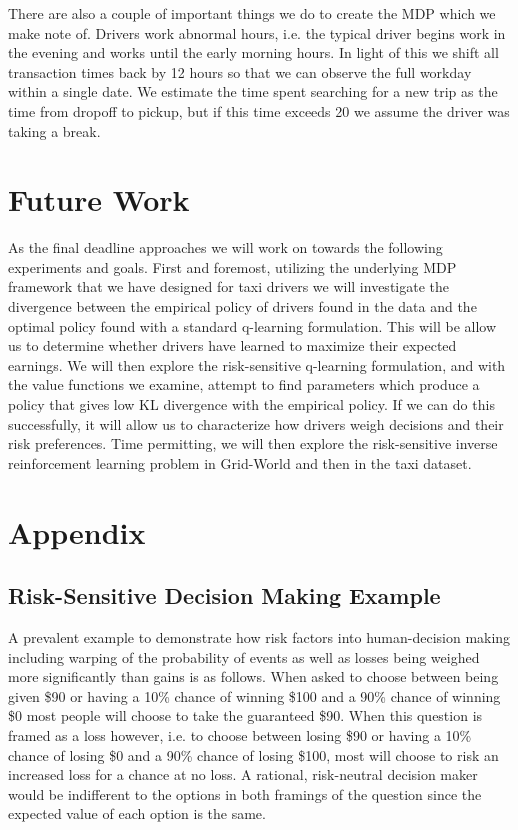 \documentclass{article}
\begin{document}
There are also a couple of important things we do to create the MDP which we make note of. Drivers work abnormal hours, i.e. the typical driver begins work in the evening and works until the early morning hours. In light of this we shift all transaction times back by 12 hours so that we can observe the full workday within a single date. We estimate the time spent searching for a new trip as the time from dropoff to pickup, but if this time exceeds 20 we assume the driver was taking a break.
\section{Future Work}
As the final deadline approaches we will work on towards the following experiments and goals. First and foremost, utilizing the underlying MDP framework that we have designed for taxi drivers we will investigate the divergence between the empirical policy of drivers found in the data and the optimal policy found with a standard q-learning formulation. This will be allow us to determine whether drivers have learned to maximize their expected earnings. We will then explore the risk-sensitive q-learning formulation, and with the value functions we examine, attempt to find parameters which produce a policy that gives low KL divergence with the empirical policy. If we can do this successfully, it will allow us to characterize how drivers weigh decisions and their risk preferences. Time permitting, we will then explore the risk-sensitive inverse reinforcement learning problem in Grid-World and then in the taxi dataset. 



\section{Appendix}\label{appendix}



\subsection{Risk-Sensitive Decision Making Example}\label{example}
A prevalent example to demonstrate how risk factors into human-decision making including warping of the probability of events as well as losses being weighed more significantly than gains is as follows. When asked to choose between being given \$90 or having a 10\% chance of winning \$100 and a 90\% chance of winning \$0 most people will choose to take the guaranteed \$90. When this question is framed as a loss however, i.e. to choose between losing \$90 or having a 10\% chance of losing \$0 and a 90\% chance of losing \$100, most will choose to risk an increased loss for a chance at no loss. A rational, risk-neutral decision maker would be indifferent to the options in both framings of the question since the expected value of each option is the same.
\end{document}
